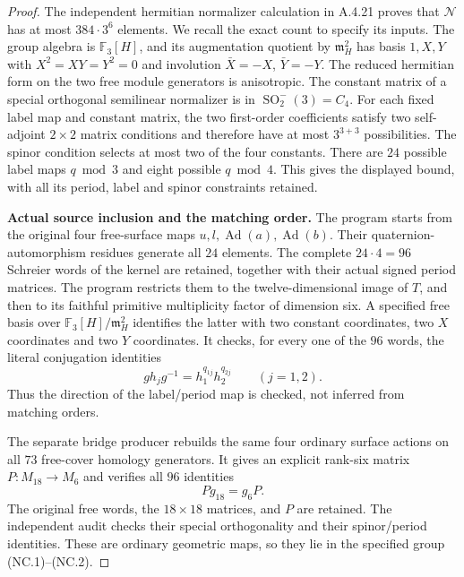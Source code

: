 \begin{proof}
The independent hermitian normalizer calculation
in A.4.21 proves that
$\mathscr N$ has at most $384\cdot3^6$ elements.
We recall the exact count to specify its inputs.
The group algebra is $\mathbb F_3[H]$, and its
augmentation quotient by $\mathfrak m_H^2$ has basis
$1,X,Y$ with $X^2=XY=Y^2=0$ and involution
$\bar X=-X$, $\bar Y=-Y$.  The reduced hermitian
form on the two free module generators is
anisotropic.  The constant matrix of a special
orthogonal semilinear normalizer is in
$\operatorname{SO}_2^-(3)=C_4$.
For each fixed label map and constant matrix,
the two first-order coefficients satisfy two
self-adjoint $2\times2$ matrix conditions and
therefore have at most $3^{3+3}$ possibilities.
The spinor condition selects at most two of the
four constants.  There are $24$ possible label
maps $q\bmod3$ and eight possible $q\bmod4$.
This gives the displayed bound, with all its
period, label and spinor constraints retained.

\textbf{Actual source inclusion and the matching order.}
The program
starts from the original four free-surface maps
$u,l,\operatorname{Ad}(a),\operatorname{Ad}(b)$.
Their quaternion-automorphism residues generate
all $24$ elements.  The complete $24\cdot4=96$
Schreier words of the kernel are retained, together
with their actual signed period matrices.
The program restricts them to the twelve-dimensional
image of $T$, and then to its faithful primitive
multiplicity factor of dimension six.  A specified
free basis over $\mathbb F_3[H]/\mathfrak m_H^2$
identifies the latter with two constant coordinates,
two $X$ coordinates and two $Y$ coordinates.
It checks, for every one of the $96$ words, the
literal conjugation identities
\[
 g h_jg^{-1}=h_1^{q_{1j}}h_2^{q_{2j}}\qquad(j=1,2).
                                                        \tag{NC.5}
\]
Thus the direction of the label/period map is
checked, not inferred from matching orders.

The separate bridge producer
rebuilds the same four ordinary surface actions on
all $73$ free-cover homology generators.  It gives
an explicit rank-six matrix $P:M_{18}\to M_6$ and
verifies all $96$ identities
\[
                         P g_{18}=g_6P.                \tag{NC.6}
\]
The original free words, the $18\times18$ matrices,
and $P$ are retained.  The independent audit checks
their special orthogonality and their spinor/period
identities.  These are ordinary geometric maps,
so they lie in the specified group (NC.1)--(NC.2).


\end{proof}
